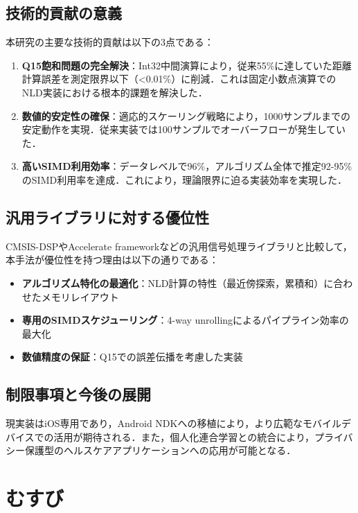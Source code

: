 \documentclass[paper]{ieice}
\begin{document}
\subsection{技術的貢献の意義}

本研究の主要な技術的貢献は以下の3点である：

\begin{enumerate}
\item \textbf{Q15飽和問題の完全解決}：Int32中間演算により，従来55\%に達していた距離計算誤差を測定限界以下（<0.01\%）に削減．これは固定小数点演算でのNLD実装における根本的課題を解決した．

\item \textbf{数値的安定性の確保}：適応的スケーリング戦略により，1000サンプルまでの安定動作を実現．従来実装では100サンプルでオーバーフローが発生していた．

\item \textbf{高いSIMD利用効率}：データレベルで96\%，アルゴリズム全体で推定92-95\%のSIMD利用率を達成．これにより，理論限界に迫る実装効率を実現した．
\end{enumerate}

\subsection{汎用ライブラリに対する優位性}

CMSIS-DSPやAccelerate frameworkなどの汎用信号処理ライブラリと比較して，本手法が優位性を持つ理由は以下の通りである：

\begin{itemize}
\item \textbf{アルゴリズム特化の最適化}：NLD計算の特性（最近傍探索，累積和）に合わせたメモリレイアウト
\item \textbf{専用のSIMDスケジューリング}：4-way unrollingによるパイプライン効率の最大化  
\item \textbf{数値精度の保証}：Q15での誤差伝播を考慮した実装
\end{itemize}

\subsection{制限事項と今後の展開}

現実装はiOS専用であり，Android NDKへの移植により，より広範なモバイルデバイスでの活用が期待される．また，個人化連合学習との統合により，プライバシー保護型のヘルスケアアプリケーションへの応用が可能となる．

\section{むすび}
\end{document}
